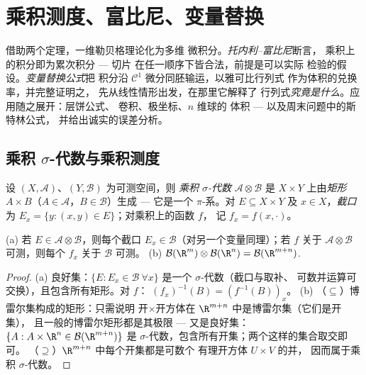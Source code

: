 \chapter{乘积测度、富比尼、变量替换}
\label{ch:b3:product}

借助两个定理，一维勒贝格理论化为多维
微积分。\emph{托内利--富比尼}断言，
乘积上的积分即为累次积分 --- 切片
在任一顺序下皆合法，前提是可以实际
检验的假设。\emph{变量替换公式}把
积分沿 $\mathcal C^1$ 微分同胚输运，以雅可比行列式
作为体积的兑换率，并完整证明之，
先从线性情形出发，在那里它解释了
行列式\emph{究竟是什么}。应用随之展开：层饼公式、
卷积、极坐标、$n$ 维球的
体积 --- 以及周末问题中的斯特林公式，
并给出诚实的误差分析。

\section{乘积 $\sigma$-代数与乘积测度}

\begin{definition}\label{def:b3:product:sigma}
设 $(X, \mathcal A)$、$(Y, \mathcal B)$ 为可测空间，则
\emph{乘积 $\sigma$-代数} $\mathcal A \otimes \mathcal B$ 是 $X \times
Y$ 上由\emph{矩形} $A \times B$（$A \in
\mathcal A$，$B \in \mathcal B$）生成 --- 它是一个 $\pi$-系。对 $E
\subseteq X\times Y$ 及 $x \in X$，\emph{截口}为 $E_x
= \{y : (x,y) \in E\}$；对乘积上的函数 $f$，
记 $f_x = f(x, \cdot)$。
\end{definition}

\begin{proposition}\label{prop:b3:product:sections}
(a) 若 $E \in \mathcal A\otimes\mathcal B$，则每个截口 $E_x
\in \mathcal B$（对另一个变量同理）；若 $f$ 关于 $\mathcal
A\otimes\mathcal B$ 可测，则每个 $f_x$ 关于 $\mathcal
B$ 可测。
(b) $\mathcal B(\R^m)\otimes\mathcal B(\R^n) = \mathcal
B(\R^{m+n})$.
\end{proposition}

\begin{proof}
(a) 良好集：$\{E : E_x \in \mathcal B\ \forall x\}$ 是一个
$\sigma$-代数（截口与取补、
可数并运算可交换），且包含所有矩形。对 $f$：
$(f_x)^{-1}(B) = (f^{-1}(B))_x$。
(b) （$\subseteq$）博雷尔集构成的矩形：只需说明
开$\times$开方体在 $\R^{m+n}$ 中是博雷尔集（它们是开集），
且一般的博雷尔矩形都是其极限 ---
又是良好集：$\{A : A\times\R^n \in \mathcal B(\R^{m+n})\}$ 是
$\sigma$-代数，包含所有开集；两个这样的集合取交即可。
（$\supseteq$）$\R^{m+n}$ 中每个开集都是可数个
有理开方体 $U\times V$ 的并，
因而属于乘积 $\sigma$-代数。
\end{proof}

